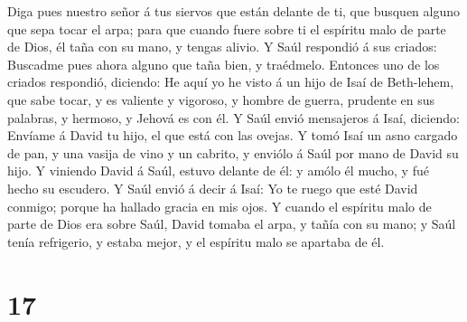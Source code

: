  Diga pues nuestro señor á tus siervos que están delante de
ti, que busquen alguno que sepa tocar el arpa; para que cuando fuere
sobre ti el espíritu malo de parte de Dios, él taña con su mano, y
tengas alivio.  Y Saúl respondió á sus criados: Buscadme
pues ahora alguno que taña bien, y traédmelo.  Entonces uno
de los criados respondió, diciendo: He aquí yo he visto á un hijo de
Isaí de Beth-lehem, que sabe tocar, y es valiente y vigoroso, y hombre
de guerra, prudente en sus palabras, y hermoso, y Jehová es con él.
 Y Saúl envió mensajeros á Isaí, diciendo: Envíame á David
tu hijo, el que está con las ovejas.  Y tomó Isaí un asno
cargado de pan, y una vasija de vino y un cabrito, y enviólo á Saúl por
mano de David su hijo.  Y viniendo David á Saúl, estuvo
delante de él: y amólo él mucho, y fué hecho su escudero. 
Y Saúl envió á decir á Isaí: Yo te ruego que esté David conmigo; porque
ha hallado gracia en mis ojos.  Y cuando el espíritu malo
de parte de Dios era sobre Saúl, David tomaba el arpa, y tañía con su
mano; y Saúl tenía refrigerio, y estaba mejor, y el espíritu malo se
apartaba de él.

\hypertarget{section-16}{%
\section{17}\label{section-16}}

